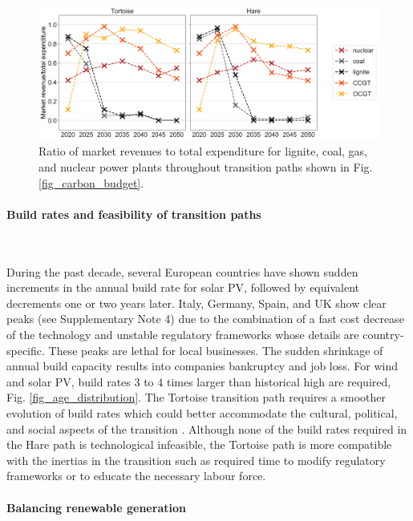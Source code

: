 \documentclass[5p]{elsarticle} %
\begin{document}
\begin{figure}[!h]
\centering
\includegraphics[width=\columnwidth]{figures/revenue_vs_expenditure_Base.png}
\caption{Ratio of market revenues to total expenditure for lignite, coal, gas, and nuclear power plants throughout transition paths shown in Fig. \ref{fig_carbon_budget}. } \label{fig_revenue_vs_expenditure} 
\end{figure}

\paragraph{\textbf{Build rates and feasibility of transition paths}} \

During the past decade, several European countries have shown sudden increments in the annual build rate for solar PV, followed by equivalent decrements one or two years later. Italy, Germany, Spain, and UK show clear peaks (see Supplementary Note 4)  due to the combination of a fast cost decrease of the technology and unstable regulatory frameworks whose details are country-specific. These peaks are lethal for local businesses. The sudden shrinkage of annual build capacity results into companies bankruptcy and job loss. For wind and solar PV, build rates 3 to 4 times larger than historical high are required, Fig. \ref{fig_age_distribution}. The Tortoise transition path requires a smoother evolution of build rates which could better accommodate the cultural, political, and social aspects of the transition \cite{Geels_2017}. Although none of the build rates required in the Hare path is technological infeasible, the Tortoise path is more compatible with the inertias in the transition such as required time to modify regulatory frameworks or to educate the necessary labour force. 

\FloatBarrier

\paragraph{\textbf{Balancing renewable generation}} \
\end{document}
